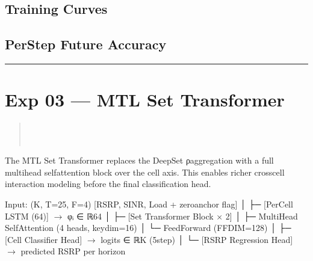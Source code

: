 \documentclass[letterpaper,10pt,english]{sphinxmanual}
\begin{document}
\subsection{Training Curves}
\label{\detokenize{architecture:id1}}
\sphinxAtStartPar
{}


\subsection{Per\sphinxhyphen{}Step Future Accuracy}
\label{\detokenize{architecture:per-step-future-accuracy}}
\sphinxAtStartPar
{}


\bigskip\hrule\bigskip



\section{Exp 03 — MTL Set Transformer}
\label{\detokenize{architecture:exp-03-mtl-set-transformer}}\begin{quote}

\sphinxAtStartPar
{} \\
 \\
 
\end{quote}

\sphinxAtStartPar
The MTL Set Transformer replaces the DeepSet ρ\sphinxhyphen{}aggregation with a full multi\sphinxhyphen{}head self\sphinxhyphen{}attention block over the cell axis. This enables richer cross\sphinxhyphen{}cell interaction modeling before the final classification head.

\sphinxAtStartPar
{}

\begin{sphinxVerbatim}[commandchars=\\\{\}]
Input: (K, T=25, F=4)   [RSRP, SINR, Load + zero\PYGZhy{}anchor flag]
    │
    ├─ [Per\PYGZhy{}Cell LSTM (64)] \(\rightarrow\) φᵢ ∈ ℝ\PYGZca{}64
    │
    ├─ [Set Transformer Block × 2]
    │       ├─ Multi\PYGZhy{}Head Self\PYGZhy{}Attention (4 heads, key\PYGZus{}dim=16)
    │       └─ Feed\PYGZhy{}Forward (FF\PYGZus{}DIM=128)
    │
    ├─ [Cell Classifier Head] \(\rightarrow\) logits ∈ ℝ\PYGZca{}K              (5\PYGZhy{}step)
    │
    └─ [RSRP Regression Head] \(\rightarrow\) predicted RSRP per horizon
\end{sphinxVerbatim}
\end{document}
